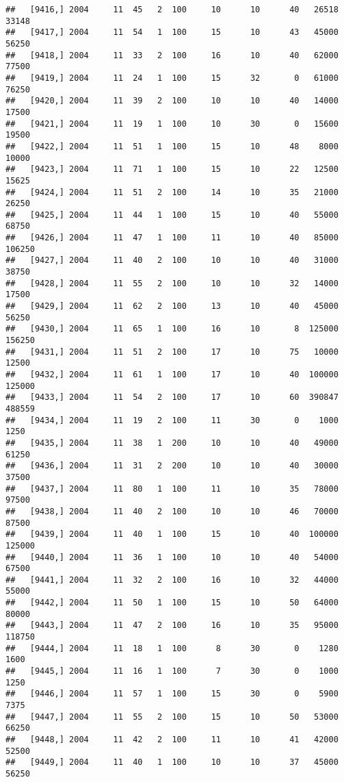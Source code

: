 \documentclass{article}\usepackage[]{graphicx}\usepackage[]{color}
\makeatletter
\newenvironment{kframe}{%
 \def\at@end@of@kframe{}%
 \ifinner\ifhmode%
  \def\at@end@of@kframe{\end{minipage}}%
  \begin{minipage}{\columnwidth}%
 \fi\fi%
 \def\FrameCommand##1{\hskip\@totalleftmargin \hskip-\fboxsep
 \colorbox{shadecolor}{##1}\hskip-\fboxsep
     \hskip-\linewidth \hskip-\@totalleftmargin \hskip\columnwidth}%
 \MakeFramed {\advance\hsize-\width
   \@totalleftmargin\z@ \linewidth\hsize
   \@setminipage}}%
 {\par\unskip\endMakeFramed%
 \at@end@of@kframe}
\newenvironment{knitrout}{}{} %
\makeatother
\begin{document}
\begin{knitrout}
\begin{kframe}
\begin{verbatim}
##   [9416,] 2004     11  45   2  100     10      10      40   26518   33148
##   [9417,] 2004     11  54   1  100     15      10      43   45000   56250
##   [9418,] 2004     11  33   2  100     16      10      40   62000   77500
##   [9419,] 2004     11  24   1  100     15      32       0   61000   76250
##   [9420,] 2004     11  39   2  100     10      10      40   14000   17500
##   [9421,] 2004     11  19   1  100     10      30       0   15600   19500
##   [9422,] 2004     11  51   1  100     15      10      48    8000   10000
##   [9423,] 2004     11  71   1  100     15      10      22   12500   15625
##   [9424,] 2004     11  51   2  100     14      10      35   21000   26250
##   [9425,] 2004     11  44   1  100     15      10      40   55000   68750
##   [9426,] 2004     11  47   1  100     11      10      40   85000  106250
##   [9427,] 2004     11  40   2  100     10      10      40   31000   38750
##   [9428,] 2004     11  55   2  100     10      10      32   14000   17500
##   [9429,] 2004     11  62   2  100     13      10      40   45000   56250
##   [9430,] 2004     11  65   1  100     16      10       8  125000  156250
##   [9431,] 2004     11  51   2  100     17      10      75   10000   12500
##   [9432,] 2004     11  61   1  100     17      10      40  100000  125000
##   [9433,] 2004     11  54   2  100     17      10      60  390847  488559
##   [9434,] 2004     11  19   2  100     11      30       0    1000    1250
##   [9435,] 2004     11  38   1  200     10      10      40   49000   61250
##   [9436,] 2004     11  31   2  200     10      10      40   30000   37500
##   [9437,] 2004     11  80   1  100     11      10      35   78000   97500
##   [9438,] 2004     11  40   2  100     10      10      46   70000   87500
##   [9439,] 2004     11  40   1  100     15      10      40  100000  125000
##   [9440,] 2004     11  36   1  100     10      10      40   54000   67500
##   [9441,] 2004     11  32   2  100     16      10      32   44000   55000
##   [9442,] 2004     11  50   1  100     15      10      50   64000   80000
##   [9443,] 2004     11  47   2  100     16      10      35   95000  118750
##   [9444,] 2004     11  18   1  100      8      30       0    1280    1600
##   [9445,] 2004     11  16   1  100      7      30       0    1000    1250
##   [9446,] 2004     11  57   1  100     15      30       0    5900    7375
##   [9447,] 2004     11  55   2  100     15      10      50   53000   66250
##   [9448,] 2004     11  42   2  100     11      10      41   42000   52500
##   [9449,] 2004     11  40   1  100     10      10      37   45000   56250

\end{verbatim}
\end{kframe}
\end{knitrout}
\end{document}
